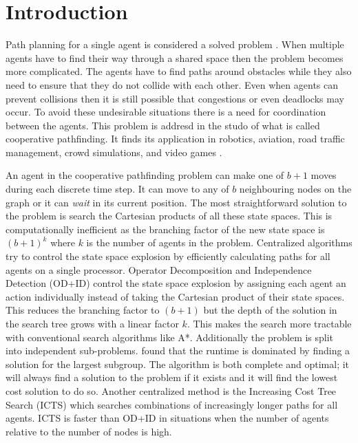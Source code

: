 \section{Introduction}\label{sec:intro}
Path planning for a single agent is considered a solved problem
\cite{sharon2013}. When multiple agents have to find their way through a
shared
space then the problem becomes more complicated. The agents have to find paths
around obstacles while they also need to ensure that they do not collide with
each other. Even when agents can prevent collisions then it is still possible
that congestions or even deadlocks may occur. To avoid these undesirable
situations there is a need for coordination between the agents. This problem is
addresd in the studo of what is called cooperative pathfinding. It finds its
application in robotics, aviation, road traffic management, crowd simulations,
and video games \cite{standley2011}.

An agent in the cooperative pathfinding problem can make one of $b+1$ moves 
during each discrete time step. It can move to any of $b$ neighbouring nodes on 
the graph or it can \emph{wait} in its current position. The most 
straightforward 
solution to the problem is search the Cartesian products of all these state 
spaces. This is computationally inefficient \cite{hopcroft1984,sharon2013} as 
the branching factor of the new state space is $(b+1)^k$ where $k$ is the 
number of agents in the problem. Centralized algorithms try to control the 
state space explosion by efficiently calculating paths for all agents on a 
single processor. Operator Decomposition and Independence Detection (OD+ID) 
\cite{standley2010,standley2011} control the state space explosion by 
assigning each agent an action individually instead of taking the Cartesian 
product of their state spaces. This reduces the branching factor to $(b+1)$ but 
the depth of the solution in the search tree grows with a linear factor $k$. 
This makes the search more tractable with conventional search algorithms like 
A*. Additionally the problem is split into independent sub-problems.
\cite{standley2010} found that the runtime is dominated by finding a solution 
for the largest subgroup. The algorithm is both complete and optimal; it will 
always find a solution to the problem if it exists and it will find the lowest 
cost solution to do so. Another centralized method is the Increasing Cost Tree 
Search (ICTS) \cite{sharon2013} which searches combinations of increasingly 
longer paths for all agents. ICTS is faster than OD+ID in situations when the 
number of agents relative to the number of nodes is high.

